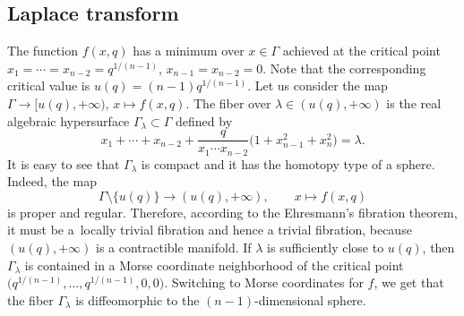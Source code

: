\documentclass[pdftex]{sigma}
\numberwithin{equation}{section}
\begin{document}
\subsection{Laplace transform}
The function $f(x,q)$ has a minimum over $x\in \Gamma$ achieved at the
critical point $x_1=\cdots = x_{n-2}=q^{1/(n-1)}$,
$x_{n-1}=x_{n-2}=0$. Note that the corresponding critical value is
$u(q) = (n-1) q^{1/(n-1)}$. Let us consider the map $\Gamma\to
[u(q),+\infty)$, $x\mapsto f(x,q)$. The fiber over $\lambda \in
(u(q),+\infty)$ is the real algebraic hypersurface $\Gamma_\lambda\subset
\Gamma$ defined by
\[
x_1+\cdots + x_{n-2} +
\frac{q}{x_1\cdots x_{n-2}}
\bigl(1+x_{n-1}^2+x_n^2\bigr) = \lambda.
\]
It is easy to see that $\Gamma_\lambda$ is compact and it has the homotopy
type of a sphere. Indeed, the map
\[
\Gamma\setminus{\{u(q)\}}\to (u(q),+\infty),\qquad
x\mapsto f(x,q)
\]
is proper and regular. Therefore, according to the
Ehresmann's fibration theorem, it must be a~locally trivial fibration and hence
a trivial fibration, because $(u(q),+\infty)$ is a contractible
manifold. If $\lambda$ is sufficiently close to $u(q)$, then
$\Gamma_\lambda$ is contained in a Morse coordinate neighborhood of the
critical point $\big(q^{1/(n-1)},\dots, q^{1/(n-1)},0,0\big)$. Switching to
Morse coordinates for $f$, we get that the fiber $\Gamma_\lambda$ is
diffeomorphic to the $(n-1)$-dimensional sphere.
\end{document}
